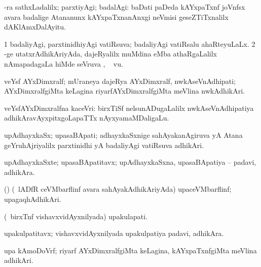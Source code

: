 {{{{{\bentry
{} 
\gl{\upa}
\expl{}
\bmng
 -ra sathxLadalilx; parxtiyAgi; badalAgi:  baDati paDeda kAYxpaTxnf joVnfsx avara badalige Atananunx kAYxpaTxnanAnxgi neVmisi geseZTiTxnalilx dAKlAmxDalAyitu. 
\emng
\eentry

\bentry
{} 
\gl{\sapUpa}
\expl{}
\bmng
\bnum
\num{1} badaliyAgi, parxtinidhiyAgi vatiRsuva; badaliyAgi vatiRsalu ahaRteyuLaLx. 
\num{2} -ge utatxrAdhikAriyAda, dajeRyalilx muMdina eMba athaRgaLalilx nAmapadagaLa hiMde seVruva \sapUpa, \udA\  \mo vu. 
\enum
\emng
\eentry

\bentry
{}
\gl{\nA}
\expl{}
\bmng
veYsf AYxDimxralf; mUraneya dajeRya AYxDimxralf, nwkAseVnAdhipati; AYxDimxralfgiMta keLagina riyarfAYxDimxralfgiMta meVlina nwkAdhikAri. 
\emng
\eentry

\bentry
{} 
\gl{\nA}
\bmng
 veYsfAYxDimxralfna kaceVri:  birxTiSf nelsunADugaLalilx nwkAseVnAdhipatiya adhikAravAyxpitxgoLapaTTx nAyxyamaMDaligaLu. 
\emng
\eentry

\bentry
{} 
\gl{\nA}
\expl{}
\bmng
 upAdhayxkaSx; upasaBApati; adhayxkaSxnige sahAyakanAgiruva yA Atana geYruhAjriyalilx parxtinidhi yA badaliyAgi vatiRsuva adhikAri. 
\emng
\eentry

\bentry
{} 
\gl{\nA}
\expl{}
\bmng
 upAdhayxkaSxte; upasaBApatitavx; upAdhayxkaSxna, upasaBApatiya -- padavi, adhikAra. 
\emng
\eentry

\bentry
{} 
\gl{\nA}
\expl{}
\bmng
 (\birx) (\kanmu\ lADfR ceVMbarflinf avara sahAyakAdhikAriyAda) upaceVMbarflinf; upagaqhAdhikAri. 
\emng
\eentry

\bentry
{} 
\gl{\nA}
\expl{}
\bmng
 (\kanmu\ birxTnf vishavxvidAyxnilyada) upakulapati. 
\emng
\eentry

\bentry
{} 
\gl{\nA}
\expl{}
\bmng
 upakulpatitavx; vishavxvidAyxnilyada upakulpatiya padavi, adhikAra. 
\emng
\eentry

\bentry
{} 
\gl{\nA}
\expl{}
\bmng
 upa kAmoDoVrf; riyarf AYxDimxralfgiMta keLagina, kAYxpaTxnfgiMta meVlina adhikAri. 
\emng
\eentry

}}}}}
